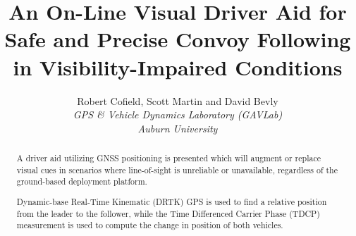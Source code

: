 \documentclass[twocolumn,10pt]{article}
\begin{document}

\title{\textbf{An On-Line Visual Driver Aid for Safe and Precise Convoy Following in Visibility-Impaired Conditions}}
\author{
  Robert Cofield, Scott Martin and David Bevly \\
  \em{GPS \& Vehicle Dynamics Laboratory (GAVLab)} \\
  \em{Auburn University} \\
}
\date{} %
\maketitle


\begin{abstract}
  A driver aid utilizing GNSS positioning is presented which will augment or replace visual cues in scenarios where line-of-sight is unreliable or unavailable, regardless of the ground-based deployment platform.

  Dynamic-base Real-Time Kinematic (DRTK) GPS is used to find a relative position from the leader to the follower, while the Time Differenced Carrier Phase (TDCP) measurement is used to compute the change in position of both vehicles.



  

\end{abstract}
\end{document}
